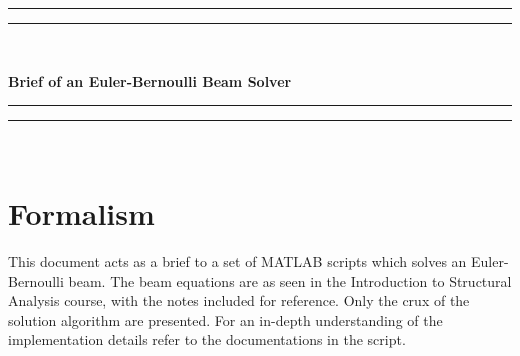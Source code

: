 \documentclass[11pt,a4paper]{article}
\begin{document}
\begin{titlepage} %

\rule{\textwidth}{1.6pt}\vspace*{-\baselineskip}\vspace*{2pt}
\rule{\textwidth}{0.4pt}\\[\baselineskip]
\vspace*{-1cm}
\begin{center}
\huge{\bf Brief of an Euler-Bernoulli Beam Solver}
\end{center}
\rule{\textwidth}{0.4pt}\vspace*{-\baselineskip}\vspace*{3.2pt}
\rule{\textwidth}{1.6pt}\\[\baselineskip]

\vspace{8cm}


\vspace*{\fill}

\end{titlepage}


\newpage
\setcounter{page}{1}

\section{Formalism}
This document acts as a brief to a set of MATLAB scripts which solves an Euler-Bernoulli beam. The beam equations are as seen in the Introduction to Structural Analysis course, with the notes included for reference. Only the crux of the solution algorithm are presented. For an in-depth understanding of the implementation details refer to the documentations in the script.
\end{document}
